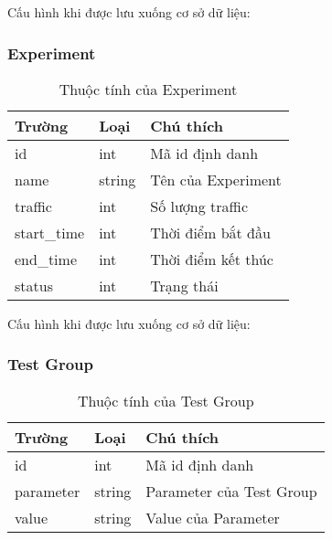 Cấu hình khi được lưu xuống cơ sở dữ liệu:

\begin{itemize}
\end{itemize}

\subsubsection{Experiment}

\begin{table}[H]
	\centering
	\begin{tabular}{|l|l|l|}
		\hline
		Trường      & Loại   & Chú thích          \\ \hline
		id          & int    & Mã id định danh    \\ \hline
		name        & string & Tên của Experiment \\ \hline
		traffic     & int    & Số lượng traffic   \\ \hline
		start\_time & int    & Thời điểm bắt đầu  \\ \hline
		end\_time   & int    & Thời điểm kết thúc \\ \hline
		status      & int    & Trạng thái         \\ \hline
	\end{tabular}
	\caption{Thuộc tính của Experiment}
\end{table}

Cấu hình khi được lưu xuống cơ sở dữ liệu:

\begin{itemize}
\end{itemize}

\subsubsection{Test Group}

\begin{table}[H]
	\centering
	\begin{tabular}{|l|l|l|}
		\hline
		Trường    & Loại   & Chú thích                \\ \hline
		id        & int    & Mã id định danh          \\ \hline
		parameter & string & Parameter của Test Group \\ \hline
		value     & string & Value của Parameter      \\ \hline
	\end{tabular}
	\caption{Thuộc tính của Test Group}
\end{table}


